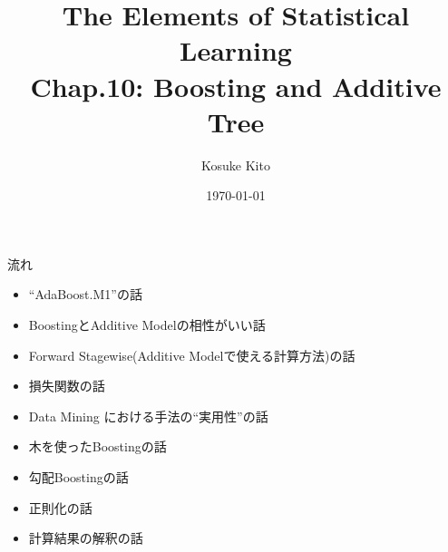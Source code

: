 \documentclass[dvipdfmx,8pt]{beamer}
\title{The Elements of Statistical Learning\\Chap.10: Boosting and Additive Tree}
\date{\today}
\author{Kosuke Kito}
\begin{document}
  \maketitle
  \begin{frame}{流れ}
    \begin{itemize}
      \item ``AdaBoost.M1''の話
      \item BoostingとAdditive Modelの相性がいい話
      \item Forward Stagewise(Additive Modelで使える計算方法)の話
      \item 損失関数の話
      \item Data Mining における手法の``実用性''の話
      \item 木を使ったBoostingの話
      \item 勾配Boostingの話
      \item 正則化の話
      \item 計算結果の解釈の話
    \end{itemize}
  \end{frame}
\end{document}
